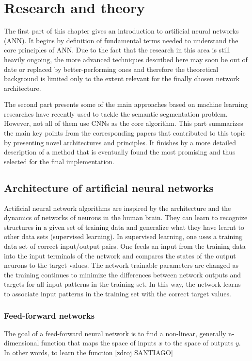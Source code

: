 \chapter{Research and theory}
\label{research}
The first part of this chapter gives an introduction to artificial neural networks (ANN). It begins by definition of fundamental terms needed to understand the core principles of ANN. Due to the fact that the research in this area is still heavily ongoing, the more advanced techniques described here may soon be out of date or replaced by better-performing ones and therefore the theoretical background is limited only to the extent relevant for the finally chosen network architecture. 

The second part presents some of the main approaches based on machine learning researches have recently used to tackle the semantic segmentation problem. However, not all of them use CNNs as the core algorithm. This part summarizes the main key points from the corresponding papers that contributed to this topic by presenting novel architectures and principles. It finishes by a more detailed description of a method that is eventually found the most promising and thus selected for the final implementation.

\section{Architecture of artificial neural networks}
Artificial neural network algorithms are inspired by the architecture and the dynamics
of networks of neurons in the human brain. They can learn to recognize structures in a given set of training data and generalize what they have learnt to other data sets (supervised learning). In supervised learning, one uses a training data set of correct input/output pairs. One feeds an input from the training data into the input terminals of the network and compares the states of the output neurons to the target values. The network trainable parameters are changed as the training continues to minimize the differences between network outputs and targets for all input patterns in the training set. In this way, the network learns to associate input patterns in the training set with the correct target values. 

\subsection{Feed-forward networks}

The goal of a feed-forward neural network is to find a non-linear, generally n-dimensional function that maps the space of inputs $ x $ to the space of outputs $ y $. In other words, to learn the function [zdroj SANTIAGO]

